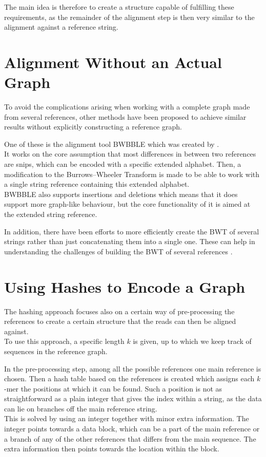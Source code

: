 \documentclass[a4paper,12pt,twoside,BCOR=10mm]{scrbook}
\begin{document}
The main idea is therefore to create a structure capable of fulfilling these requirements, 
as the remainder of the alignment step is then very similar to the alignment against a reference string.

\section{Alignment Without an Actual Graph}

To avoid the complications arising when working with 
a complete graph made from several references, other methods have been proposed 
to achieve similar results without explicitly constructing a reference graph.

One of these is the alignment tool BWBBLE which 
was created by \citet{Huang2013}. \\
It works on the core assumption that most differences in between two references 
are snips, which can be encoded with a specific extended alphabet. 
Then, a modification to the Burrows--Wheeler Transform is made to 
be able to work with a single string reference containing this extended alphabet. \\
BWBBLE also supports insertions and deletions which means that it does support 
more graph-like behaviour, but the core functionality of it is aimed at the extended string reference.

In addition, there have been efforts to more efficiently create the BWT 
of several strings rather than just concatenating them into a single one. 
These can help in understanding the challenges of building the BWT of several references \citep{Holt2014}.

\section{Using Hashes to Encode a Graph}

The hashing approach focuses also on a certain way of pre-processing the references 
to create a certain structure that the reads can then be aligned against. \\
To use this approach, a specific length $ k $ is given, up to which we keep track of 
sequences in the reference graph.

In the pre-processing step, among all the possible references one main reference is chosen. 
Then a hash table based on the references is created which 
assigns each $ k $-mer the positions at which it can be found. 
Such a position is not as straightforward as a 
plain integer that gives the index within a string, as the data can lie on branches 
off the main reference string. \\
This is solved by using an integer together with minor extra information. 
The integer points towards a data block, which can be a part of the main 
reference or a branch of any of the other references that differs from the 
main sequence. The extra information then points towards the location within the block.
\end{document}
